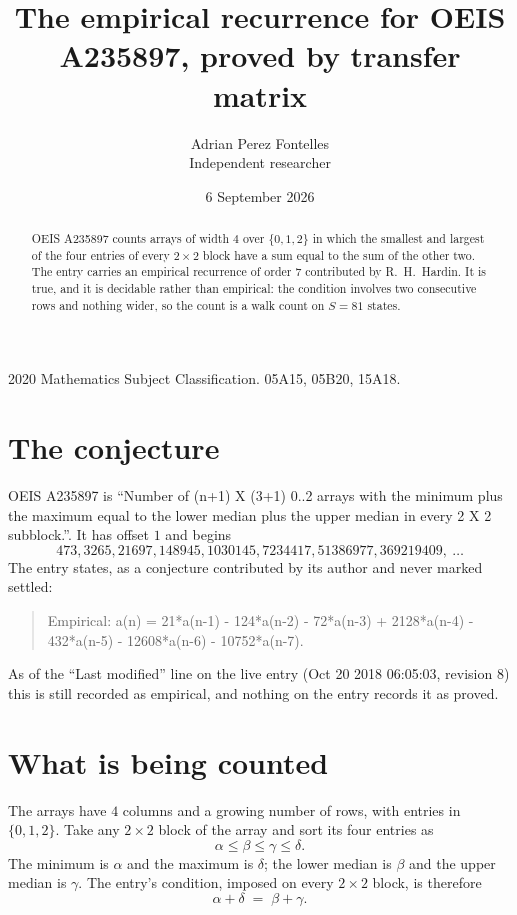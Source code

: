 \documentclass[11pt,a4paper]{article}
\title{The empirical recurrence for OEIS A235897, proved by transfer matrix}
\author{Adrian Perez Fontelles\\ \small Independent researcher}
\date{6 September 2026}
\theoremstyle{plain}
\theoremstyle{definition}
\begin{document}
\maketitle

\begin{abstract}
OEIS A235897 counts arrays of width $4$ over $\{0,1,2\}$ in which the smallest and largest of the
four entries of every $2\times2$ block have a sum equal to the sum of the other two. The entry
carries an empirical recurrence of order $7$ contributed by R.~H.~Hardin. It is true, and
it is decidable rather than empirical: the condition involves two consecutive rows and nothing
wider, so the count is a walk count on $S=81$ states.
\end{abstract}

\noindent\small 2020 Mathematics Subject Classification. 05A15, 05B20, 15A18.\normalsize

\section{The conjecture}

OEIS A235897 is ``Number of (n+1) X (3+1) 0..2 arrays with the minimum plus the maximum equal to the lower median plus the upper median in every 2 X 2 subblock.''. It has offset $1$ and begins
\[
473, 3265, 21697, 148945, 1030145, 7234417, 51386977, 369219409,\ \dots
\]
The entry states, as a conjecture contributed by its author and never marked settled:
\begin{quote}
Empirical: a(n) = 21*a(n-1) - 124*a(n-2) - 72*a(n-3) + 2128*a(n-4) - 432*a(n-5) - 12608*a(n-6) - 10752*a(n-7).
\end{quote}
As of the ``Last modified'' line on the live entry (Oct 20 2018 06:05:03, revision 8) this is still
recorded as empirical, and nothing on the entry records it as proved.

\section{What is being counted}

The arrays have $4$ columns and a growing number of rows, with entries in $\{0,1,2\}$. Take any
$2\times2$ block of the array and sort its four entries as
\[
\alpha\le\beta\le\gamma\le\delta .
\]
The minimum is $\alpha$ and the maximum is $\delta$; the lower median is $\beta$ and the upper
median is $\gamma$. The entry's condition, imposed on every $2\times2$ block, is therefore
\[
\alpha+\delta\;=\;\beta+\gamma .
\]
\end{document}
